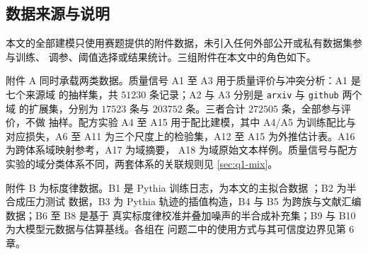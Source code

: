 \documentclass[bwprint]{gmcmthesis}
\numberwithin{equation}{section}
\numberwithin{figure}{section}
\numberwithin{table}{section}
\begin{document}
%
%

\subsection{数据来源与说明}

本文的全部建模只使用赛题提供的附件数据，未引入任何外部公开或私有数据集参与训练、
调参、阈值选择或结果统计。三组附件在本文中的角色如下。

附件 A 同时承载两类数据。质量信号 A1 至 A3 用于质量评价与冲突分析：A1 是七个来源域
的抽样集，共 $51230$ 条记录；A2 与 A3 分别是 \texttt{arxiv} 与 \texttt{github} 两个域
的扩展集，分别为 $17523$ 条与 $203752$ 条。三者合计 $272505$ 条，全部参与评价，不做
抽样。配方实验 A4 至 A15 用于配比建模，其中 A4/A5 为训练配比与对应损失，A6 至 A11
为三个尺度上的检验集，A12 至 A15 为外推估计表。A16 为跨体系域映射参考，A17 为域摘要，
A18 为域原始文本样例。质量信号与配方实验的域分类体系不同，两套体系的关联规则见
\ref{sec:q1-mix}。

附件 B 为标度律数据。B1 是 Pythia 训练日志，为本文的主拟合数据 \cite{biderman_pythia_2023}；B2 为半合成压力测试
数据，B3 为 Pythia 轨迹的插值构造，B4 与 B5 为跨族与文献汇编数据；B6 至 B8 是基于
真实标度律校准并叠加噪声的半合成补充集；B9 与 B10 为大模型元数据与估算基线。各组在
问题二中的使用方式与其可信度边界见第 6 章。
\end{document}
